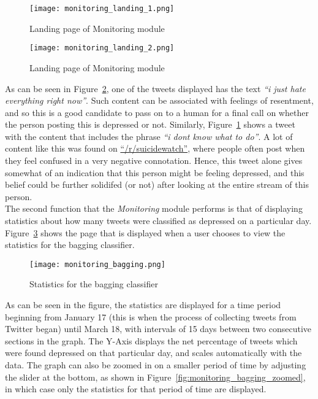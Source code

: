 \begin{figure}
    \centering
    \texttt{[image: monitoring\_landing\_1.png]}
    \caption{Landing page of Monitoring module}
    \label{fig:monitoring_landing_1}
\end{figure}

\begin{figure}
    \centering
    \texttt{[image: monitoring\_landing\_2.png]}
    \caption{Landing page of Monitoring module}
    \label{fig:monitoring_landing_2}
\end{figure}

As can be seen in Figure~\ref{fig:monitoring_landing_2}, one of the tweets displayed has the text \emph{``i just hate everything right now''}. Such content can be associated with feelings of resentment, and so this is a good candidate to pass on to a human for a final call on whether the person posting this is depressed or not. Similarly, Figure~\ref{fig:monitoring_landing_1} shows a tweet with the content that includes the phrase \emph{``i dont know what to do''}. A lot of content like this was found on \href{http://www.reddit.com/r/suicidewatch}{``/r/suicidewatch''}, where people often post when they feel confused in a very negative connotation. Hence, this tweet alone gives somewhat of an indication that this person might be feeling depressed, and this belief could be further solidifed (or not) after looking at the entire stream of this person.\\

The second function that the \emph{Monitoring} module performs is that of displaying statistics about how many tweets were classified as depressed on a particular day. Figure~\ref{fig:monitoring_bagging} shows the page that is displayed when a user chooses to view the statistics for the bagging classifier.\\

\begin{figure}
    \centering
    \texttt{[image: monitoring\_bagging.png]}
    \caption{Statistics for the bagging classifier}
    \label{fig:monitoring_bagging}
\end{figure}

As can be seen in the figure, the statistics are displayed for a time period beginning from January 17 (this is when the process of collecting tweets from Twitter began) until March 18, with intervals of 15 days between two consecutive sections in the graph. The Y-Axis displays the net percentage of tweets which were found depressed on that particular day, and scales automatically with the data.  The graph can also be zoomed in on a smaller period of time by adjusting the slider at the bottom, as shown in Figure~\ref{fig:monitoring_bagging_zoomed}, in which case only the statistics for that period of time are displayed.\\

